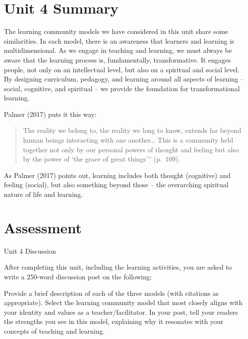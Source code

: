 \documentclass[
]{book}
\begin{document}
\hypertarget{unit-4-summary}{%
\section*{Unit 4 Summary}\label{unit-4-summary}}

The learning community models we have considered in this unit share some similarities. In each model, there is an awareness that learners and learning is multidimensional. As we engage in teaching and learning, we must always be aware that the learning process is, fundamentally, transformative. It engages people, not only on an intellectual level, but also on a spiritual and social level. By designing curriculum, pedagogy, and learning around all aspects of learning -- social, cognitive, and spiritual -- we provide the foundation for transformational learning.

Palmer (2017) puts it this way:

\begin{quote}
The reality we belong to, the reality we long to know, extends far beyond human beings interacting with one another\ldots{} This is a community held together not only by our personal powers of thought and feeling but also by the power of `the grace of great things''' (p.~109).
\end{quote}

As Palmer (2017) points out, learning includes both thought (cognitive) and feeling (social), but also something beyond those -- the overarching spiritual nature of life and learning.

\hypertarget{assessment-3}{%
\section*{Assessment}\label{assessment-3}}

\begin{assessment}
{Unit 4 Discussion}

After completing this unit, including the learning activities, you are
asked to write a 250-word discussion post on the following:

Provide a brief description of each of the three models (with citations
as appropriate). Select the learning community model that most closely
aligns with your identity and values as a teacher/facilitator. In your
post, tell your readers the strengths you see in this model, explaining
why it resonates with your concepts of teaching and learning.
\end{assessment}
\end{document}

